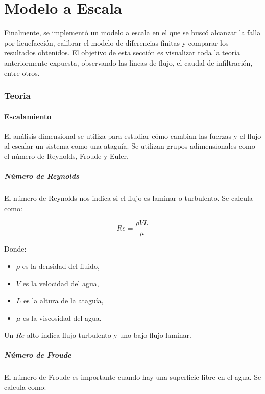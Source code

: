 \part{Modelo a Escala}

Finalmente, se implementó un modelo a escala en el que se buscó alcanzar la falla por licuefacción, calibrar el modelo de diferencias finitas y comparar los resultados obtenidos. El objetivo de esta sección es visualizar toda la teoría anteriormente expuesta, observando las líneas de flujo, el caudal de infiltración, entre otros.

\section{Teoria}

\subsection{Escalamiento}
El análisis dimensional se utiliza para estudiar cómo cambian las fuerzas y el flujo al escalar un sistema como una ataguía. Se utilizan grupos adimensionales como el número de Reynolds, Froude y Euler.

\subsubsection{Número de Reynolds}
El número de Reynolds nos indica si el flujo es laminar o turbulento. Se calcula como:

\begin{equation}
Re = \frac{\rho V L}{\mu}
\end{equation}

Donde:
\begin{itemize}
    \item $\rho$ es la densidad del fluido,
    \item $V$ es la velocidad del agua,
    \item $L$ es la altura de la ataguía,
    \item $\mu$ es la viscosidad del agua.
\end{itemize}

Un $Re$ alto indica flujo turbulento y uno bajo flujo laminar.

\subsubsection{Número de Froude}
El número de Froude es importante cuando hay una superficie libre en el agua. Se calcula como:

